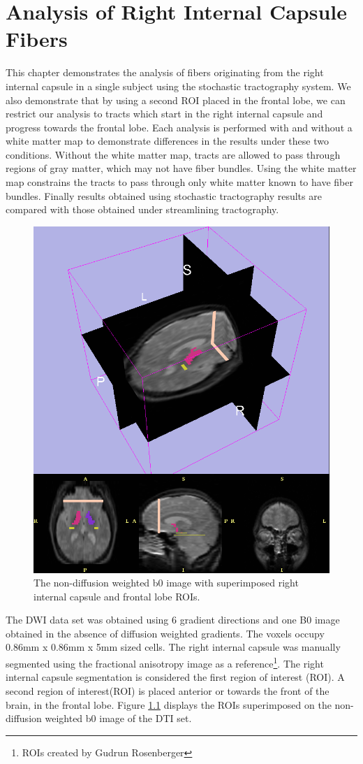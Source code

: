 \chapter{Analysis of Right Internal Capsule Fibers}
This chapter demonstrates the analysis of fibers originating from the right internal capsule in a single subject using the stochastic tractography system.  We also demonstrate that by using a second ROI placed in the frontal lobe, we can restrict our analysis to tracts which start in the right internal capsule and progress towards the frontal lobe.  Each analysis is performed with and without a white matter map to demonstrate differences in the results under these two conditions.  Without the white matter map, tracts are allowed to pass through regions of gray matter, which may not have fiber bundles.  Using the white matter map constrains the tracts to pass through only white matter known to have fiber bundles.  Finally results obtained using stochastic tractography results are compared with those obtained under streamlining tractography.
\begin{figure}
  \center
	\includegraphics[width=0.75\linewidth]{slicer-0001}
	\caption{The non-diffusion weighted b0 image with superimposed right internal capsule and frontal lobe ROIs.}
	\label{fig:labelmap}
\end{figure}
The DWI data set was obtained using 6 gradient directions and one B0 image obtained in the absence of diffusion weighted gradients.  The voxels occupy 0.86mm x 0.86mm x 5mm sized cells. The right internal capsule was manually segmented using the fractional anisotropy image as a reference\footnote{ROIs created by Gudrun Rosenberger}.  The right internal capsule segmentation is considered the first region of interest (ROI).  A second region of interest(ROI) is placed anterior or towards the front of the brain, in the frontal lobe.  Figure \ref{fig:labelmap} displays the ROIs superimposed on the non-diffusion weighted b0 image of the DTI set.

